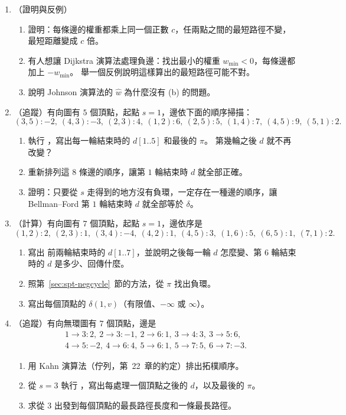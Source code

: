 \begin{enumerate}
\item \label{spt-q-const}（證明與反例）
\begin{enumerate}
\item 證明：每條邊的權重都乘上同一個正數 $c$，任兩點之間的最短路徑不變，最短距離變成 $c$ 倍。
\item 有人想讓 Dijkstra 演算法處理負邊：找出最小的權重 $w_{\min} < 0$，每條邊都加上
$-w_{\min}$。 舉一個反例說明這樣算出的最短路徑可能不對。
\item 說明 Johnson 演算法的 $\hat{w}$ 為什麼沒有 (b) 的問題。
\end{enumerate}

\item \label{spt-q-bf}（追蹤）有向圖有 $5$ 個頂點，起點 $s = 1$，邊依下面的順序掃描：
\[
(3, 5)\!:-2,\ (4, 3)\!:-3,\ (2, 3)\!:4,\ (1, 2)\!:6,\ (2, 5)\!:5,\ (1, 4)\!:7,\ (4, 5)\!:9,\ (5, 1)\!:2.
\]
\begin{enumerate}
\item 執行 ，寫出每一輪結束時的 $d[1..5]$ 和最後的 $\pi$。 第幾輪之後 $d$
就不再改變？
\item 重新排列這 $8$ 條邊的順序，讓第 $1$ 輪結束時 $d$ 就全部正確。
\item 證明：只要從 $s$ 走得到的地方沒有負環，一定存在一種邊的順序，讓 Bellman--Ford 第 $1$
輪結束時 $d$ 就全部等於 $\delta$。
\end{enumerate}

\item \label{spt-q-neg}（計算）有向圖有 $7$ 個頂點，起點 $s = 1$，邊依序是
\[
(1, 2)\!:2,\ (2, 3)\!:1,\ (3, 4)\!:-4,\ (4, 2)\!:1,\ (4, 5)\!:3,\ (1, 6)\!:5,\ (6, 5)\!:1,\ (7, 1)\!:2.
\]
\begin{enumerate}
\item 寫出  前兩輪結束時的 $d[1..7]$，並說明之後每一輪 $d$ 怎麼變、第 $6$
輪結束時的 $d$ 是多少、回傳什麼。
\item 照第~\ref{sec:spt-negcycle}~節的方法，從 $\pi$ 找出負環。
\item 寫出每個頂點的 $\delta(1, v)$（有限值、$-\infty$ 或 $\infty$）。
\end{enumerate}

\item \label{spt-q-dag}（追蹤）有向無環圖有 $7$ 個頂點，邊是
\begin{gather*}
1 \to 3\!:2,\ 2 \to 3\!:-1,\ 2 \to 6\!:1,\ 3 \to 4\!:3,\ 3 \to 5\!:6, \\
4 \to 5\!:-2,\ 4 \to 6\!:4,\ 5 \to 6\!:1,\ 5 \to 7\!:5,\ 6 \to 7\!:-3.
\end{gather*}
\begin{enumerate}
\item 用 Kahn 演算法（佇列，第~22~章的約定）排出拓樸順序。
\item 從 $s = 3$ 執行 ，寫出每處理一個頂點之後的 $d$，以及最後的
$\pi$。
\item 求從 $3$ 出發到每個頂點的最長路徑長度和一條最長路徑。
\end{enumerate}


\end{enumerate}
